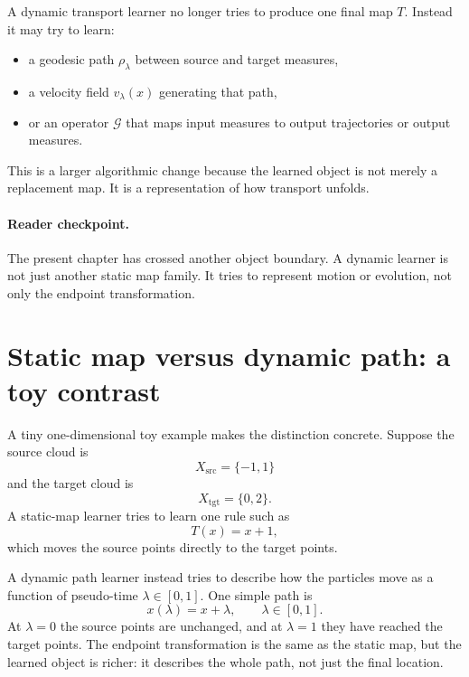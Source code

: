A dynamic transport learner no longer tries to produce one final map
\(T\).  Instead it may try to learn:
\begin{itemize}
  \item a geodesic path \(\rho_\lambda\) between source and target measures,
  \item a velocity field \(v_\lambda(x)\) generating that path,
  \item or an operator \(\mathcal G\) that maps input measures to output
  trajectories or output measures.
\end{itemize}
This is a larger algorithmic change because the learned object is not merely a
replacement map.  It is a representation of how transport unfolds.

\paragraph{Reader checkpoint.}
The present chapter has crossed another object boundary.  A dynamic learner is not
just another static map family.  It tries to represent motion or evolution, not
only the endpoint transformation.

\section{Static map versus dynamic path: a toy contrast}
\label{sec:bf-neural-ot-dynamic-toy-contrast}

A tiny one-dimensional toy example makes the distinction concrete.  Suppose the
source cloud is
\[
  X_{\mathrm{src}}=\{-1,1\}
\]
and the target cloud is
\[
  X_{\mathrm{tgt}}=\{0,2\}.
\]
A static-map learner tries to learn one rule such as
\begin{equation}
\label{eq:bf-neural-ot-dynamic-static-map}
  T(x)=x+1,
\end{equation}
which moves the source points directly to the target points.

A dynamic path learner instead tries to describe how the particles move as a
function of pseudo-time \(\lambda\in[0,1]\).  One simple path is
\begin{equation}
\label{eq:bf-neural-ot-dynamic-path-example}
  x(\lambda)=x+\lambda,
  \qquad
  \lambda\in[0,1].
\end{equation}
At \(\lambda=0\) the source points are unchanged, and at \(\lambda=1\) they have
reached the target points.  The endpoint transformation is the same as the static
map, but the learned object is richer: it describes the whole path, not just the
final location.

